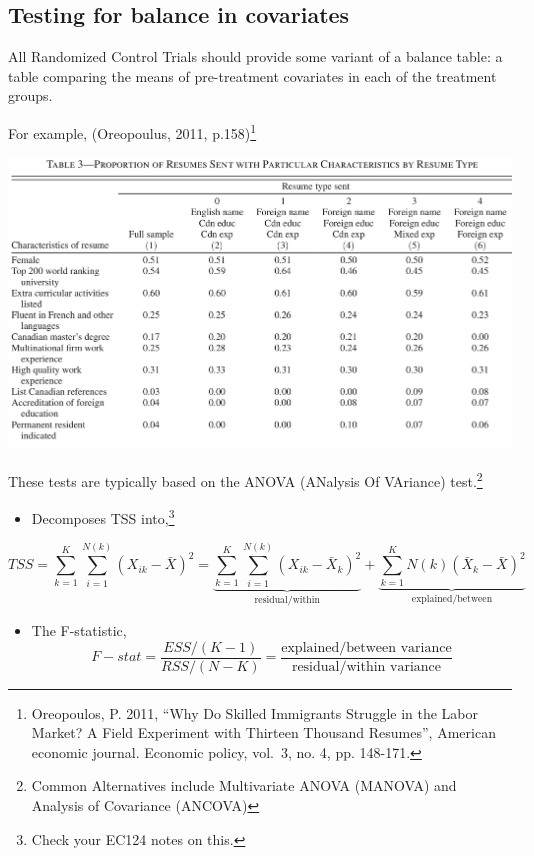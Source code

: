\documentclass[
  letterpaper,
  DIV=11,
  numbers=noendperiod]{scrreprt}
\providecommand{\tightlist}{%
  \setlength{\itemsep}{0pt}\setlength{\parskip}{0pt}}\usepackage{longtable,booktabs,array}
\theoremstyle{definition}
\theoremstyle{remark}
\begin{document}
\subsection{Testing for balance in
covariates}\label{testing-for-balance-in-covariates}

All Randomized Control Trials should provide some variant of a balance
table: a table comparing the means of pre-treatment covariates in each
of the treatment groups.

For example, (Oreopoulus, 2011, p.158)\footnote{Oreopoulos, P. 2011,
  ``Why Do Skilled Immigrants Struggle in the Labor Market? A Field
  Experiment with Thirteen Thousand Resumes'', American economic
  journal. Economic policy, vol.~3, no. 4, pp. 148-171.}

\includegraphics{Images/Oreopoulus_Balance_1.png}

These tests are typically based on the ANOVA ({AN}alysis {O}f
{VA}riance) test.\footnote{Common Alternatives include Multivariate
  ANOVA (MANOVA) and Analysis of Covariance (ANCOVA)}

\begin{itemize}
\tightlist
\item
  Decomposes TSS into,\footnote{Check your EC124 notes on this.}
\end{itemize}

\[
                TSS = \sum_{k=1}^{K}\sum_{i=1}^{N(k)}(X_{ik}-\bar{X})^2 = \underbrace{\sum_{k=1}^{K}\sum_{i=1}^{N(k)}(X_{ik}-\bar{X}_k)^2}_\text{residual/within}+\underbrace{\sum_{k=1}^{K}N(k)(\bar{X}_k-\bar{X})^2}_\text{explained/between}
\]

\begin{itemize}
\tightlist
\item
  The F-statistic, \[
              F-stat =\frac{ESS/(K-1)}{RSS/(N-K)} = \frac{\text{explained/between variance}}{\text{residual/within variance}}
  \]
\end{itemize}
\end{document}
